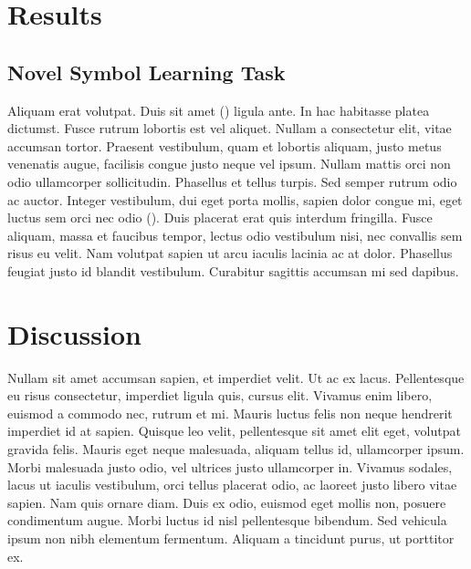 \begin{refsection}
\newpage
\section{Results}
\subsection{Novel Symbol Learning Task}
Aliquam erat volutpat. Duis sit amet (\ChiTest[1][69.74][.0001]) ligula ante. In hac habitasse platea dictumst. Fusce rutrum lobortis est vel aliquet. Nullam a consectetur elit, vitae accumsan tortor. Praesent vestibulum, quam et lobortis aliquam, justo metus venenatis augue, facilisis congue justo neque vel ipsum. Nullam mattis orci non odio ullamcorper sollicitudin. Phasellus et tellus turpis. Sed semper rutrum odio ac auctor. Integer vestibulum, dui eget porta mollis, sapien dolor congue mi, eget luctus sem orci nec odio (\FtestSQ[1][22.22][60.32][.001]). Duis placerat erat quis interdum fringilla. Fusce aliquam, massa et faucibus tempor, lectus odio vestibulum nisi, nec convallis sem risus eu velit. Nam volutpat sapien ut arcu iaculis lacinia ac at dolor. Phasellus feugiat justo id blandit vestibulum. Curabitur sagittis accumsan mi sed dapibus.

\vspace{-15pt}

\section{Discussion}

Nullam sit amet accumsan sapien, et imperdiet velit. Ut ac ex lacus. Pellentesque eu risus consectetur, imperdiet ligula quis, cursus elit. Vivamus enim libero, euismod a commodo nec, rutrum et mi. Mauris luctus felis non neque hendrerit imperdiet id at sapien. Quisque leo velit, pellentesque sit amet elit eget, volutpat gravida felis. Mauris eget neque malesuada, aliquam tellus id, ullamcorper ipsum. Morbi malesuada justo odio, vel ultrices justo ullamcorper in. Vivamus sodales, lacus ut iaculis vestibulum, orci tellus placerat odio, ac laoreet justo libero vitae sapien. Nam quis ornare diam. Duis ex odio, euismod eget mollis non, posuere condimentum augue. Morbi luctus id nisl pellentesque bibendum. Sed vehicula ipsum non nibh elementum fermentum. Aliquam a tincidunt purus, ut porttitor ex.


\vspace*{\fill}
\begin{footnotesize}


\end{footnotesize}
\end{refsection}
